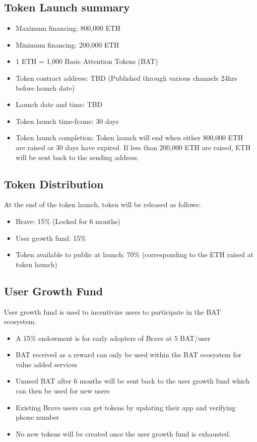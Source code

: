 \documentclass[11pt]{article}
\begin{document}
\subsection{Token Launch summary}
\label{sec-6-1}
\begin{itemize}
\item{Maximum financing: 800,000 ETH}
\item{Minimum financing:  200,000 ETH}
\item{1 ETH = 1,000 Basic Attention Tokens (BAT)}
\item{Token contract address: TBD (Published through various channels 24hrs before launch date)}
\item{Launch date and time: TBD}
\item{Token launch time-frame: 30 days}
\item{Token launch completion: Token launch will end when either 800,000 ETH are raised or 30 days have expired. If less than 200,000 ETH are raised, ETH will be sent back to the sending address.}
\end{itemize}
\subsection{Token Distribution}
\label{sec-6-2}

At the end of the token launch, token will be released as follows:
\begin{itemize}
\item{Brave: 15\% (Locked for 6 months)}
\item{User growth fund: 15\%}
\item{Token available to public at launch: 70\% (corresponding to the ETH raised at token launch)}
\end{itemize}

\subsection{User Growth Fund}
\label{sec-6-3}
User growth fund is used to incentivize users to participate in the BAT ecosystem.
\begin{itemize}
\item{A 15\% endowment is for early adopters of Brave at 5 BAT/user}
\item{BAT received as a reward can only be used within the BAT ecosystem for value added services}
\item{Unused BAT after 6 months will be sent back to the user growth fund which can then be used for new users}
\item{Existing Brave users can get tokens by updating their app and verifying phone number}
\item{No new tokens will be created once the user growth fund is exhausted.}
\end{itemize}
\end{document}
